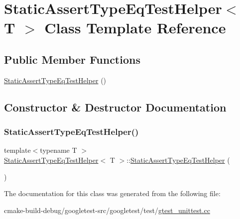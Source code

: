 \hypertarget{classStaticAssertTypeEqTestHelper}{}\section{Static\+Assert\+Type\+Eq\+Test\+Helper$<$ T $>$ Class Template Reference}
\label{classStaticAssertTypeEqTestHelper}
\subsection*{Public Member Functions}
\begin{DoxyCompactItemize}
\item 
\mbox{\hyperlink{classStaticAssertTypeEqTestHelper_a9b567f0542f353d536119dae01e1ee1d}{Static\+Assert\+Type\+Eq\+Test\+Helper}} ()
\end{DoxyCompactItemize}


\subsection{Constructor \& Destructor Documentation}
\mbox{\label{classStaticAssertTypeEqTestHelper_a9b567f0542f353d536119dae01e1ee1d}} 
\subsubsection{\texorpdfstring{StaticAssertTypeEqTestHelper()}{StaticAssertTypeEqTestHelper()}}
{\footnotesize\ttfamily template$<$typename T $>$ \\
\mbox{\hyperlink{classStaticAssertTypeEqTestHelper}{Static\+Assert\+Type\+Eq\+Test\+Helper}}$<$ T $>$\+::\mbox{\hyperlink{classStaticAssertTypeEqTestHelper}{Static\+Assert\+Type\+Eq\+Test\+Helper}} (\begin{DoxyParamCaption}{ }\end{DoxyParamCaption})\hspace{0.3cm}{\ttfamily [inline]}}



The documentation for this class was generated from the following file\+:\begin{DoxyCompactItemize}
\item 
cmake-\/build-\/debug/googletest-\/src/googletest/test/\mbox{\hyperlink{gtest__unittest_8cc}{gtest\+\_\+unittest.\+cc}}\end{DoxyCompactItemize}
